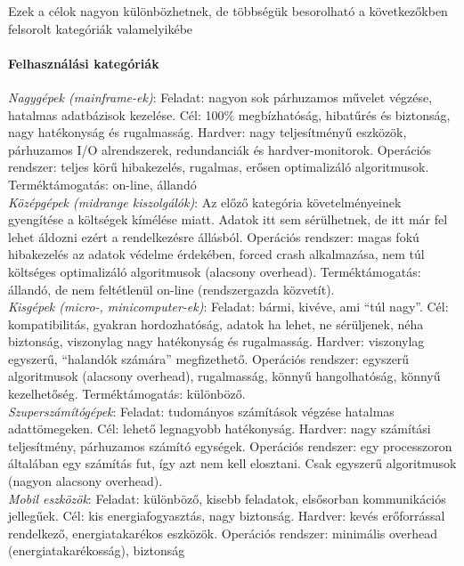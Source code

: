 \documentclass[fleqn,10pt,a4paper]{article}
\theoremstyle{magyar}
\begin{document}
  Ezek a célok nagyon különbözhetnek, de többségük besorolható a következőkben felsorolt kategóriák valamelyikébe

  

  \paragraph{Felhasználási kategóriák}
  
  \emph{Nagygépek (mainframe-ek)}: Feladat: nagyon sok párhuzamos művelet végzése, hatalmas adatbázisok kezelése. Cél:
  100\% megbízhatóság, hibatűrés és biztonság, nagy hatékonyság és rugalmasság. Hardver: nagy teljesítményű eszközök,
  párhuzamos I/O alrendszerek, redundanciák és hardver-monitorok.  Operációs rendszer: teljes körű hibakezelés,
  rugalmas, erősen optimalizáló algoritmusok. Terméktámogatás: on-line, állandó\\
  
  \emph{Középgépek (midrange kiszolgálók)}: Az előző kategória követelményeinek gyengítése a költségek kímélése
  miatt. Adatok itt sem sérülhetnek, de itt már fel lehet áldozni ezért a rendelkezésre állásból. Operációs rendszer:
  magas fokú hibakezelés az adatok védelme érdekében, forced crash alkalmazása, nem túl költséges optimalizáló
  algoritmusok (alacsony overhead). Terméktámogatás: állandó, de nem feltétlenül on-line (rendszergazda közvetít).\\


  \emph{Kisgépek (micro-, minicomputer-ek)}: Feladat: bármi, kivéve, ami ``túl nagy''. Cél: kompatibilitás, gyakran
  hordozhatóság, adatok ha lehet, ne sérüljenek, néha biztonság, viszonylag nagy hatékonyság és rugalmasság. Hardver:
  viszonylag egyszerű, ``halandók számára'' megfizethető. Operációs rendszer: egyszerű algoritmusok (alacsony overhead),
  rugalmasság, könnyű hangolhatóság, könnyű kezelhetőség. Terméktámogatás: különböző.\\
  
  \emph{Szuperszámítógépek}: Feladat: tudományos számítások végzése hatalmas adattömegeken. Cél: lehető legnagyobb
  hatékonyság. Hardver: nagy számítási teljesítmény, párhuzamos számító egységek. Operációs rendszer: egy processzoron
  általában egy számítás fut, így azt nem kell elosztani. Csak egyszerű algoritmusok (nagyon alacsony overhead).\\

  \emph{Mobil eszközök}: Feladat: különböző, kisebb feladatok, elsősorban kommunikációs jellegűek. Cél: kis
  energiafogyasztás, nagy biztonság. Hardver: kevés erőforrással rendelkező, energiatakarékos eszközök. Operációs
  rendszer: minimális overhead (energiatakarékosság), biztonság\\
\end{document}
